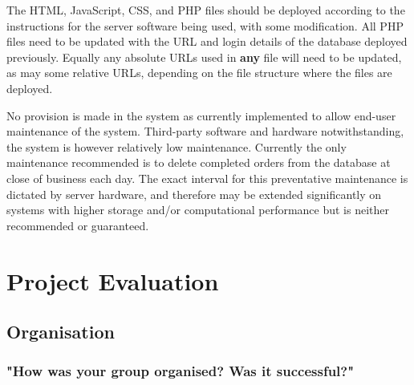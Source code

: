 \documentclass[11pt, oneside, a4paper]{report}   %
\begin{document}
The HTML, JavaScript, CSS, and PHP files should be deployed according to the instructions for the server software being used, with some modification. All PHP files need to be updated with the URL and login details of the database deployed previously. Equally any absolute URLs used in \textbf{any} file will need to be updated, as may some relative URLs, depending on the file structure where the files are deployed.

No provision is made in the system as currently implemented to allow end-user maintenance of the system. Third-party software and hardware notwithstanding, the system is however relatively low maintenance. Currently the only maintenance recommended is to delete completed orders from the database at close of business each day. The exact interval for this preventative maintenance is dictated by server hardware, and therefore may be extended significantly on systems with higher storage and/or computational performance but is neither recommended or guaranteed. 

\chapter{Project Evaluation} 
\pagebreak
\minitoc
\pagebreak
\section{Organisation} \label{sec:Organisation}
\subsection{"How was your group organised? Was it successful?"} \label{sec:Organisation - 1}
\end{document}

